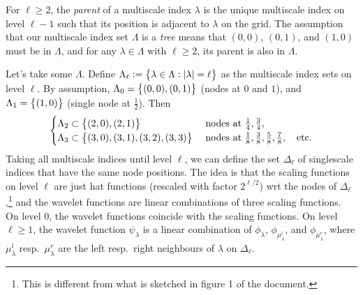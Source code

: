 \documentclass[11pt,a4paper]{amsart}
\theoremstyle{definition}
\begin{document}
For $\ell \geq 2$, the \emph{parent} of a multiscale index $\lambda$ is the
unique multiscale index on level $\ell-1$ such that its position is adjacent to
$\lambda$ on the grid. The assumption that our multiscale index set $\Lambda$ is
a \emph{tree} means that $(0,0)$, $(0,1)$, and $(1,0)$ must be in $\Lambda$, and
for any $\lambda \in \Lambda$ with $\ell\geq 2$, its parent is also in $\Lambda$.

Let's take some $\Lambda$. Define $\Lambda_\ell := \set{\lambda \in \Lambda: |\lambda| = \ell}$ as the multiscale index sets on level $\ell$. By assumption,
$\Lambda_0 = \set{(0,0), (0,1)}$ (nodes at $0$ and $1$), and
$\Lambda_1 = \set{(1,0)}$ (single node at $\frac{1}{2}$). Then 
\[
  \begin{cases}
    \Lambda_2 \subset \set{(2,0), (2,1)} &\text{ nodes at } \tfrac{1}{4}, \tfrac{3}{4}, \\
    \Lambda_3 \subset \set{(3,0), (3,1), (3,2), (3,3)} &\text{ nodes at } \tfrac{1}{8}, \tfrac{3}{8}, \tfrac{5}{8}, \tfrac{7}{8}, \quad \text{etc.}
  \end{cases}
\]
Taking all multiscale indices until level $\ell$, we can define the set
$\Delta_\ell$ of singlescale indices that have the same node positions.
The idea is that the scaling functions on level $\ell$ are just hat functions
(rescaled with factor $2^{\ell/2}$) wrt the nodes of $\Delta_\ell$,\footnote{This
is different from what is sketched in figure 1 of the document.} and the
wavelet functions are linear combinations of three scaling functions. On level 0,
the wavelet functions coincide with the scaling functions. On level $\ell \geq 1$,
the wavelet function $\psi_\lambda$ is a linear combination of $\phi_\lambda$,
$\phi_{\mu_\lambda^l}$, and $\phi_{\mu_\lambda^r}$, where $\mu_\lambda^l$ resp.~$\mu_\lambda^r$
are the left resp.~right neighbours of $\lambda$ on $\Delta_\ell$.
\end{document}
